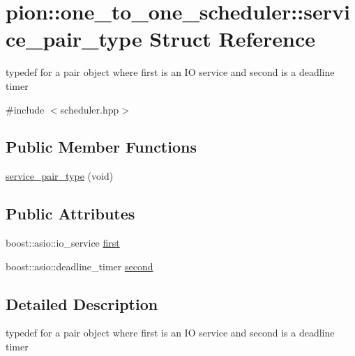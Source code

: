\hypertarget{structpion_1_1one__to__one__scheduler_1_1service__pair__type}{\section{pion\-:\-:one\-\_\-to\-\_\-one\-\_\-scheduler\-:\-:service\-\_\-pair\-\_\-type Struct Reference}
\label{structpion_1_1one__to__one__scheduler_1_1service__pair__type}
}


typedef for a pair object where first is an I\-O service and second is a deadline timer  




{\ttfamily \#include $<$scheduler.\-hpp$>$}

\subsection*{Public Member Functions}
\begin{DoxyCompactItemize}
\item 
\hyperlink{structpion_1_1one__to__one__scheduler_1_1service__pair__type_a08bcd316e63cfe6f1213dbcec567af2b}{service\-\_\-pair\-\_\-type} (void)
\end{DoxyCompactItemize}
\subsection*{Public Attributes}
\begin{DoxyCompactItemize}
\item 
boost\-::asio\-::io\-\_\-service \hyperlink{structpion_1_1one__to__one__scheduler_1_1service__pair__type_a74fee2ba10cca771f6db6da000b0d9bb}{first}
\item 
boost\-::asio\-::deadline\-\_\-timer \hyperlink{structpion_1_1one__to__one__scheduler_1_1service__pair__type_ac809326d5069e14a65eb6effb94dac7b}{second}
\end{DoxyCompactItemize}


\subsection{Detailed Description}
typedef for a pair object where first is an I\-O service and second is a deadline timer 

